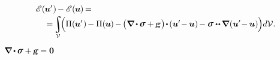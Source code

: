\nopagebreak\vspace{-0.1em}\begin{equation*}
\begin{multlined}[\displaywidth]
\potentialenergyfunctional \hspace{.16ex} (\hspace{-0.1ex}\bm{u}'\hspace{.1ex}) \hspace{-0.2ex} -
\potentialenergyfunctional \hspace{.16ex} (\hspace{-0.1ex}\bm{u}\hspace{-0.1ex}) \hspace{-0.2ex}
=
\\[-0.1em]
%
= \hspace{-0.3ex}
\scalebox{0.9}{$\displaystyle\integral\displaylimits_{\mathcal{V}}$} \hspace{-0.44ex}
\Bigl(
\potentialenergydensity (\hspace{-0.1ex}\bm{u}'\hspace{.1ex}) \hspace{-0.2ex}
- \potentialenergydensity (\hspace{-0.1ex}\bm{u}\hspace{-0.1ex}) \hspace{-0.2ex}
- \hspace{-0.2ex} \bigl( \hspace{.1ex} \boldnabla \hspace{-0.1ex} \dotp \hspace{-0.1ex} \linearstress + \hspace{-0.1ex} \volumeloadvector \hspace{.1ex} \bigr) \hspace{-0.3ex} \dotp \hspace{-0.2ex} ( \bm{u}' \hspace{-0.4ex} - \hspace{-0.1ex} \bm{u} ) \hspace{-0.2ex}
- \linearstress \dotdotp \hspace{-0.1ex} \boldnabla \hspace{.1ex} ( \bm{u}' \hspace{-0.4ex} - \hspace{-0.1ex} \bm{u} ) \hspace{-0.1ex}
\Bigr) d\mathcal{V}
.
\end{multlined}
\end{equation*}

\noindent
{}
${ \hspace{-0.24ex}
\boldnabla
\hspace{-0.1ex} \dotp \hspace{-0.1ex}
\linearstress
+ \hspace{-0.1ex} \volumeloadvector \hspace{-0.15ex}
= \zerovector }$


